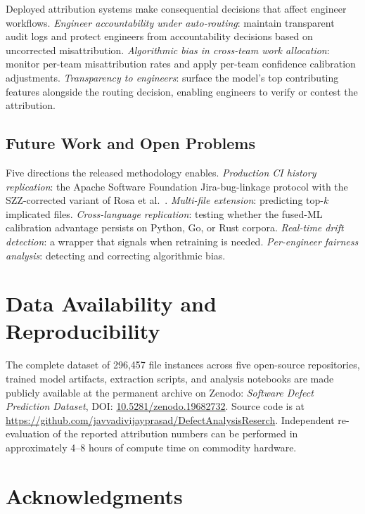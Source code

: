 \documentclass[11pt,a4paper]{article}
\begin{document}
Deployed attribution systems make consequential decisions that affect engineer workflows. \textit{Engineer accountability under auto-routing}: maintain transparent audit logs and protect engineers from accountability decisions based on uncorrected misattribution. \textit{Algorithmic bias in cross-team work allocation}: monitor per-team misattribution rates and apply per-team confidence calibration adjustments. \textit{Transparency to engineers}: surface the model's top contributing features alongside the routing decision, enabling engineers to verify or contest the attribution.

\subsection{Future Work and Open Problems}
\label{sec:future_work_f}

Five directions the released methodology enables. \textit{Production CI history replication}: the Apache Software Foundation Jira-bug-linkage protocol with the SZZ-corrected variant of Rosa et al.~\cite{rosa2021}. \textit{Multi-file extension}: predicting top-$k$ implicated files. \textit{Cross-language replication}: testing whether the fused-ML calibration advantage persists on Python, Go, or Rust corpora. \textit{Real-time drift detection}: a wrapper that signals when retraining is needed. \textit{Per-engineer fairness analysis}: detecting and correcting algorithmic bias.

\section*{Data Availability and Reproducibility}
\label{sec:reproducibility_f}

The complete dataset of 296{,}457 file instances across five open-source repositories, trained model artifacts, extraction scripts, and analysis notebooks are made publicly available at the permanent archive on Zenodo: \emph{Software Defect Prediction Dataset}, DOI: \href{https://doi.org/10.5281/zenodo.19682732}{10.5281/zenodo.19682732}. Source code is at \url{https://github.com/javvadivijayprasad/DefectAnalysisReserch}. Independent re-evaluation of the reported attribution numbers can be performed in approximately 4--8 hours of compute time on commodity hardware.

\section*{Acknowledgments}
\end{document}
